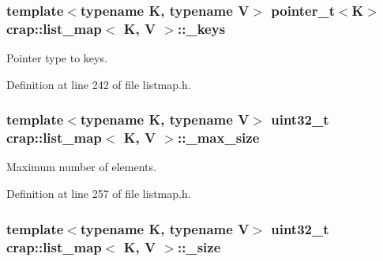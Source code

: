 \hypertarget{classcrap_1_1list__map_a2051a003947b8cd7eb227f2d4f102b89}{
\subsubsection[{\+\_\+keys}]{\setlength{\rightskip}{0pt plus 5cm}template$<$typename K, typename V$>$ {\bf pointer\+\_\+t}$<$K$>$ {\bf crap\+::list\+\_\+map}$<$ K, V $>$\+::\+\_\+keys\hspace{0.3cm}{\ttfamily [protected]}}}\label{classcrap_1_1list__map_a2051a003947b8cd7eb227f2d4f102b89}


Pointer type to keys. 



Definition at line 242 of file listmap.\+h.

\hypertarget{classcrap_1_1list__map_a9197e36a3c061b0c4e030f3f31d28563}{
\subsubsection[{\+\_\+max\+\_\+size}]{\setlength{\rightskip}{0pt plus 5cm}template$<$typename K, typename V$>$ uint32\+\_\+t {\bf crap\+::list\+\_\+map}$<$ K, V $>$\+::\+\_\+max\+\_\+size\hspace{0.3cm}{\ttfamily [protected]}}}\label{classcrap_1_1list__map_a9197e36a3c061b0c4e030f3f31d28563}


Maximum number of elements. 



Definition at line 257 of file listmap.\+h.

\hypertarget{classcrap_1_1list__map_a0bd6a5300ca68f956964a6d9edb02757}{
\subsubsection[{\+\_\+size}]{\setlength{\rightskip}{0pt plus 5cm}template$<$typename K, typename V$>$ uint32\+\_\+t {\bf crap\+::list\+\_\+map}$<$ K, V $>$\+::\+\_\+size\hspace{0.3cm}{\ttfamily [protected]}}}\label{classcrap_1_1list__map_a0bd6a5300ca68f956964a6d9edb02757}


